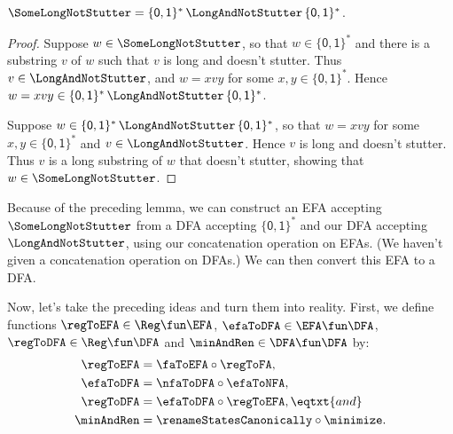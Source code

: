 \begin{lemma}
\label{Stutter3}
$\SomeLongNotStutter =
\{\mathsf{0,1}\}^*\,\LongAndNotStutter\,\{\mathsf{0,1}\}^*$.
\end{lemma}

\begin{proof}
Suppose $w\in\SomeLongNotStutter$, so that $w\in\{\mathsf{0,1}\}^*$
and there is a substring $v$ of $w$ such that $v$ is long and doesn't
stutter.  Thus $v\in\LongAndNotStutter$, and $w=xvy$ for some
$x,y\in\{\mathsf{0,1}\}^*$.  Hence
$w=xvy\in\{\mathsf{0,1}\}^*\,\LongAndNotStutter\,\{\mathsf{0,1}\}^*$.

Suppose $w\in
\{\mathsf{0,1}\}^*\,\LongAndNotStutter\,\{\mathsf{0,1}\}^*$,
so that $w=xvy$ for some $x,y\in\{\mathsf{0,1}\}^*$ and
$v\in\LongAndNotStutter$.  Hence $v$ is long and doesn't stutter.
Thus $v$ is a long substring of $w$ that doesn't stutter,
showing that $w\in\SomeLongNotStutter$.
\end{proof}

Because of the preceding lemma, we can construct an EFA accepting
$\SomeLongNotStutter$ from a DFA accepting $\{\mathsf{0,1}\}^*$ and
our DFA accepting $\LongAndNotStutter$, using our concatenation
operation on EFAs.  (We haven't given a concatenation operation on
DFAs.)  We can then convert this EFA to a DFA.

Now, let's take the preceding ideas and turn them into reality.
First, we define functions $\regToEFA\in\Reg\fun\EFA$,
$\efaToDFA\in\EFA\fun\DFA$, $\regToDFA\in\Reg\fun\DFA$
and $\minAndRen\in\DFA\fun\DFA$ by:
%
%
%
%
%
%
%
%
%
%
%
%
%
%
%
%
%
%
%
%
%
%
%
%
%
%
%
\begin{align*}
\regToEFA &= \faToEFA \circ \regToFA , \\
\efaToDFA &= \nfaToDFA \circ \efaToNFA , \\
\regToDFA &= \efaToDFA \circ \regToEFA , \eqtxt{and} \\
\minAndRen &= \renameStatesCanonically \circ \minimize .
\end{align*}

